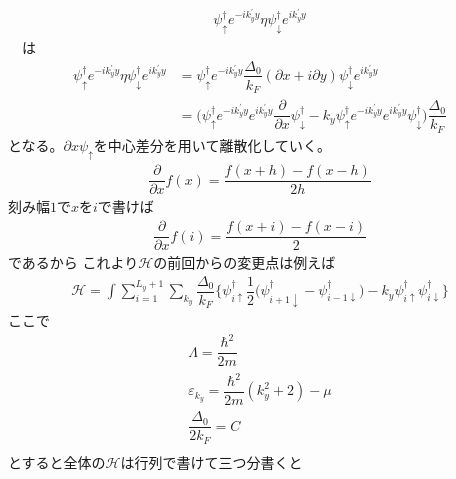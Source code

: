 \documentclass{jarticle}
\begin{document}
　\begin{align}
　\psi_{\uparrow}^{\dagger}e^{-ik_{y}^{'}y}\eta\psi_{\downarrow}^{\dagger}e^{ik_{y}^{'}y}
　\end{align}
　は
　　\begin{align}
　\psi_{\uparrow}^{\dagger}e^{-ik_{y}^{'}y}\eta\psi_{\downarrow}^{\dagger}e^{ik_{y}^{'}y}&=　\psi_{\uparrow}^{\dagger}e^{-ik_{y}^{'}y}\dfrac{\Delta_0}{k_{F}}(\partial x+i\partial y)\psi_{\downarrow}^{\dagger}e^{ik_{y}^{'}y}\\
　&=\bigl(\psi_{\uparrow}^{\dagger}e^{-ik_{y}^{'}y}e^{ik_{y}^{'}y}\dfrac{\partial}{\partial x}\psi_{\downarrow}^{\dagger}-k_{y}\psi_{\uparrow}^{\dagger}e^{-ik_{y}^{'}y}e^{ik_{y}^{'}y}\psi_{\downarrow}^{\dagger}\bigr)\dfrac{\Delta_0}{k_{F}}
　\end{align}
となる。$\partial x\psi_{\uparrow}$を中心差分を用いて離散化していく。
\begin{align}
\dfrac{\partial}{\partial x}f(x)=\dfrac{f(x+h)-f(x-h)}{2h}
\end{align}
刻み幅$1$で$x$を$i$で書けば
\begin{align}
\dfrac{\partial}{\partial x}f(i)=\dfrac{f(x+i)-f(x-i)}{2}
\end{align}
であるから
これより$\mathcal{H}$の前回からの変更点は例えば
\begin{align}
\mathcal{H}
=\int\sum_{i=1}^{L_y+1}\displaystyle\sum_{k_y}\dfrac{\Delta_0}{k_{F}}\bigl\{\psi_{i\uparrow}^{\dagger}\dfrac{1}{2}\bigl(\psi_{i+1\downarrow}^{\dagger}-\psi_{i-1\downarrow}^{\dagger}\bigr)-k_{y}\psi_{i\uparrow}^{\dagger}\psi_{i\downarrow}^{\dagger}\bigr\}
\end{align}
ここで
\begin{align}
\Lambda=\dfrac{\hbar^2}{2m}\\
\varepsilon_{k_y}=\dfrac{\hbar^2}{2m}(k_y^2+2)-\mu\\
\dfrac{\Delta_0}{2k_{F}}=C\\
\end{align}
とすると全体の$\mathcal{H}$は行列で書けて三つ分書くと
\end{document}
